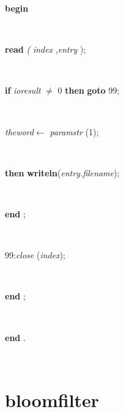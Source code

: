 \documentclass[10pt, a4paper]{article}
\begin{document}
\begin{tabbing}
\<\parbox{14cm}{\textsf{\textbf{begin} }}\\
\parbox{14cm}{\textsf{\textbf{read} \textit{(} \textit{index} ,\textit{entry} );}}\\
\parbox{14cm}{\textsf {\textbf {if } \textsf{\textit{ioresult} $\neq$ 0} \textbf{ then }  \textbf{ goto } \textsf{99}; }}\\
\parbox{14cm}{\textsf{\textit{theword}$\leftarrow$ \textit{paramstr} (1)}; }\\
\parbox{14cm}{\textsf {\textbf {then } \textsf{\textbf{writeln}(\textit{entry.filename})}; }}\\
\<\-\parbox{14cm}{\textsf{\textbf{end} ;}}\\
\parbox{14cm}{99:\textsf{\textit{close} (\textit{index})}; }\\
\<\-\<\-\parbox{14cm}{\textsf{\textbf{end} ;}}\\
\<\-\parbox{14cm}{\textsf{\textbf{end} .}}\\
\end{tabbing}
\section{bloomfilter}

\end{document}
